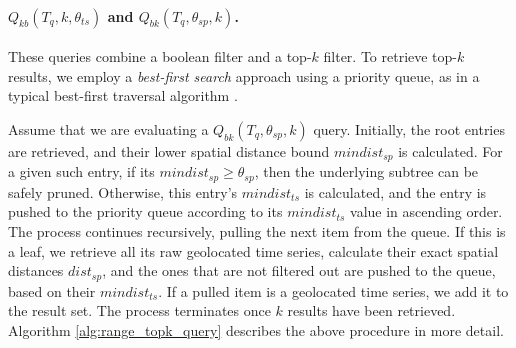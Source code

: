 \begin{algorithm}[!t]
\begin{small}
	\DontPrintSemicolon
	\BlankLine
	\caption{$Q_{bb}(T_q, \theta_{sp}, \theta_{ts})$}
	\label{alg:double_range_query}
\end{small}		
\end{algorithm}


\paragraph{$Q_{kb}(T_q, k, \theta_{ts})$ and $Q_{bk}(T_q, \theta_{sp}, k)$.} These queries combine a boolean filter and a top-$k$ filter. To retrieve top-$k$ results, we employ a \textit{best-first search} approach using a priority queue, as in a typical best-first traversal algorithm \cite{hjaltason99tods}.

Assume that we are evaluating a $Q_{bk}(T_q, \theta_{sp}, k)$ query. Initially, the root entries are retrieved, and their lower spatial distance bound $mindist_{sp}$ is calculated. For a given such entry, if its  $mindist_{sp}\geq\theta_{sp}$, then the underlying subtree can be safely pruned. Otherwise, this entry's $mindist_{ts}$ is calculated, and the entry is pushed to the priority queue according to its $mindist_{ts}$ value in ascending order. The process continues recursively, pulling the next item from the queue. If this is a leaf, we retrieve all its raw geolocated time series, calculate their exact spatial distances $dist_{sp}$, and the ones that are not filtered out are pushed to the queue, based on their $mindist_{ts}$. If a pulled item is a geolocated time series, we add it to the result set. The process terminates once $k$ results have been retrieved. Algorithm \ref{alg:range_topk_query} describes the above procedure in more detail. 

